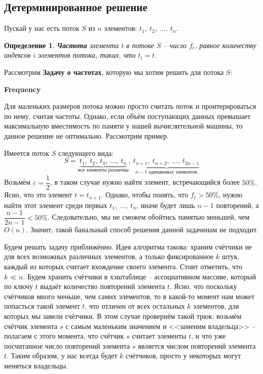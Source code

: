 \documentclass[a4paper,12pt]{article}
\newtheorem{definition}{Определение}
\begin{document}
\subsection{Детерминированное решение}

Пускай у нас есть поток $S$ из $n$ элементов: $t_1,\ t_2,\ \ldots,\ t_n$.

\begin{definition}
    \textbf{Частота} элемента $t$ в потоке $S$ -- число $f_t$, равное количеству индексов $i$ элементов потока, таких, что $t_i = t$.
\end{definition}

Рассмотрим  \textbf{Задачу о частотах}, которую мы хотим решить для потока $S$:

\textbf{Frequency}
\begin{algorithmic}
\end{algorithmic}

Для маленьких размеров потока можно просто считать поток и проитерироваться по нему, считая частоты. Однако, если объём поступающих данных превышает максимальную вместимость по памяти у нашей вычислительной машины, то данное решение не оптимально. Рассмотрим пример.

Имеется поток $S$ следующего вида:
\[S = \underbrace{t_1,\ t_2,\ t_3,\ \ldots,\ t_n}_{\text{все элементы различны}},\ \underbrace{t_{n + 1},\ t_{n + 2}, \ \ldots,\ t_{2n - 1}}_{n - 1\text{ одинаковых элементов}}\]
Возьмём $\varepsilon = \dfrac{1}{2}$, в таком случае нужно найти элемент, встречающийся более $50\%$. Ясно, что это элемент $t = t_{n + 1}$. Однако, чтобы понять, что $f_t > 50\%$, нужно найти этот элемент среди первых $t_1,\ \ldots,\ t_n$, иначе будет лишь $n - 1$ повторений, а $\dfrac{n - 1}{2n - 1} < 50\%$. Следовательно, мы не сможем обойтись памятью меньшей, чем $O(n)$. Значит, такой банальный способ решения данной задачинам не подходит.

Будем решать задачу приближённо. Идея алгоритма такова: храним счётчики не для всех возможных различных элементов, а только фиксированное $k$ штук, каждый из которых считает вхождение своего элемента. Стоит отметить, что $k \ll n$. Будем хранить счётчики в хэштаблице -- ассоциативном массиве, который по ключу $t$ выдаёт количество повторений элемента $t$. Ясно, что поскольку счётчиков много меньше, чем самих элементов, то в какой-то момент нам может попасться такой элемент $t$, что отличен от всех остальных $k$ элементов, для которых мы завели счётчики. В этом случае провернём такой трюк: возьмём счётчик элемента $s$ с самым маленьким значением и <<заменим владельца>> -- полагаем с этого момента, что счётчик $s$ считает элементы $t$, и что уже посчитанное число повторений элемента $s$ является числом повторений элемента $t$. Таким образом, у нас всегда будет $k$ счётчиков, просто у некоторых могут меняться владельцы.
\end{document}
